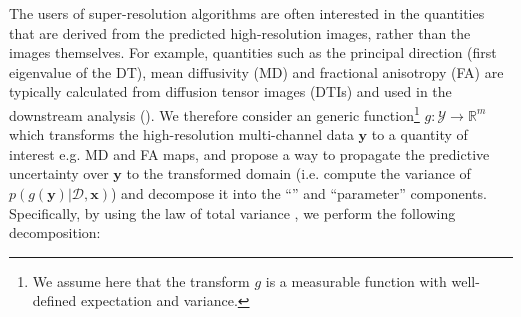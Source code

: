 The users of super-resolution algorithms are often interested in the quantities that are derived from the predicted high-resolution images, rather than the images themselves. For example, quantities such as the principal direction (first eigenvalue of the DT), mean diffusivity (MD) and fractional anisotropy (FA) are typically calculated from diffusion tensor images (DTIs) and used in the downstream analysis (). We therefore consider an generic function\footnote{We assume here that the transform $g$ is a measurable function with well-defined expectation and variance.} $g:\mathcal{Y}\rightarrow\mathbb{R}^{m}$ which transforms the high-resolution multi-channel data $\mathbf{y}$ to a quantity of interest e.g. MD and FA maps, and propose a way to propagate the predictive uncertainty over $\mathbf{y}$ to the transformed domain (i.e. compute the variance of $p(g(\mathbf{y})|\mathcal{D}, \mathbf{x})$) and decompose it into the ``'' and ``parameter'' components. Specifically, by using the law of total variance \cite{weiss2006course}, we perform the following decomposition:


